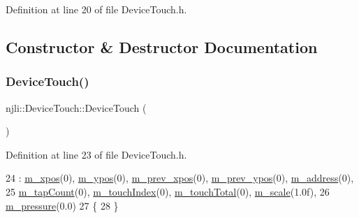 Definition at line 20 of file Device\+Touch.\+h.



\subsection{Constructor \& Destructor Documentation}
\mbox{\label{classnjli_1_1_device_touch_aa56351410e0c6fe7ced6fafd4cde27f4}} 
\subsubsection{\texorpdfstring{Device\+Touch()}{DeviceTouch()}\hspace{0.1cm}{\footnotesize\ttfamily [1/3]}}
{\footnotesize\ttfamily njli\+::\+Device\+Touch\+::\+Device\+Touch (\begin{DoxyParamCaption}{ }\end{DoxyParamCaption})\hspace{0.3cm}{\ttfamily [inline]}}



Definition at line 23 of file Device\+Touch.\+h.


\begin{DoxyCode}
24         : \mbox{\hyperlink{classnjli_1_1_device_touch_aa459469f52287f2085402117c13512f8}{m\_xpos}}(0), \mbox{\hyperlink{classnjli_1_1_device_touch_aec3c40c2adb1ba1bf5a13bf366bd3b6d}{m\_ypos}}(0), \mbox{\hyperlink{classnjli_1_1_device_touch_aefd5c83cec6edc7dcb7edeec2144c470}{m\_prev\_xpos}}(0), 
      \mbox{\hyperlink{classnjli_1_1_device_touch_adc6f1bce3fa81e81f1a01ca55b2b3db7}{m\_prev\_ypos}}(0), \mbox{\hyperlink{classnjli_1_1_device_touch_adf8b9a7a96b90d0639aca0b9982a95d7}{m\_address}}(0),
25           \mbox{\hyperlink{classnjli_1_1_device_touch_af4506b66dcc8e44597244c9a6827bd0d}{m\_tapCount}}(0), \mbox{\hyperlink{classnjli_1_1_device_touch_a8702a0eb417f912b2b8733b2f21a8060}{m\_touchIndex}}(0), \mbox{\hyperlink{classnjli_1_1_device_touch_ad36aeb2b221ff37cf29d6b5f837d0d93}{m\_touchTotal}}(0), 
      \mbox{\hyperlink{classnjli_1_1_device_touch_ae07cde00eac9eb6e816f261bdb0df9d4}{m\_scale}}(1.0f),
26           \mbox{\hyperlink{classnjli_1_1_device_touch_a1fbc998f1460afc213b0ba31410599bd}{m\_pressure}}(0.0)
27     \{
28     \}
\end{DoxyCode}
\mbox{\label{classnjli_1_1_device_touch_aa34b346fb2574885542d03fe8170ecbc}} 
